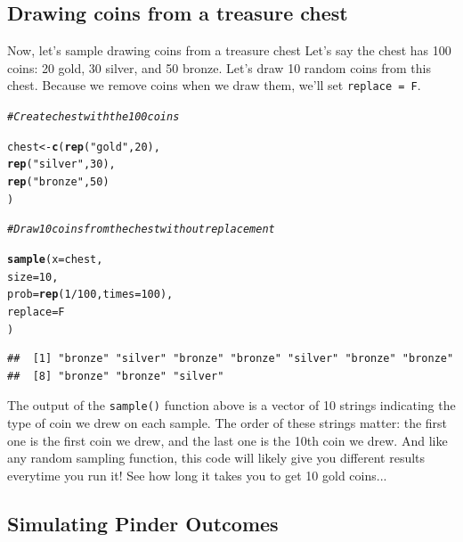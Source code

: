 \documentclass{tufte-book}\usepackage[]{graphicx}\usepackage[]{color}
\makeatletter
\newcommand{\hlnum}[1]{\textcolor[rgb]{0.686,0.059,0.569}{#1}}%
\newcommand{\hlstr}[1]{\textcolor[rgb]{0.192,0.494,0.8}{#1}}%
\newcommand{\hlcom}[1]{\textcolor[rgb]{0.678,0.584,0.686}{\textit{#1}}}%
\newcommand{\hlopt}[1]{\textcolor[rgb]{0,0,0}{#1}}%
\newcommand{\hlstd}[1]{\textcolor[rgb]{0.345,0.345,0.345}{#1}}%
\newcommand{\hlkwb}[1]{\textcolor[rgb]{0.69,0.353,0.396}{#1}}%
\newcommand{\hlkwc}[1]{\textcolor[rgb]{0.333,0.667,0.333}{#1}}%
\newcommand{\hlkwd}[1]{\textcolor[rgb]{0.737,0.353,0.396}{\textbf{#1}}}%
\newenvironment{kframe}{%
 \def\at@end@of@kframe{}%
 \ifinner\ifhmode%
  \def\at@end@of@kframe{\end{minipage}}%
  \begin{minipage}{\columnwidth}%
 \fi\fi%
 \def\FrameCommand##1{\hskip\@totalleftmargin \hskip-\fboxsep
 \colorbox{shadecolor}{##1}\hskip-\fboxsep
     \hskip-\linewidth \hskip-\@totalleftmargin \hskip\columnwidth}%
 \MakeFramed {\advance\hsize-\width
   \@totalleftmargin\z@ \linewidth\hsize
   \@setminipage}}%
 {\par\unskip\endMakeFramed%
 \at@end@of@kframe}
\newenvironment{knitrout}{}{} %
\makeatother
\begin{document}
\subsection{Drawing coins from a treasure chest}

Now, let's sample drawing coins from a treasure chest Let's say the chest has 100 coins: 20 gold, 30 silver, and 50 bronze. Let's draw 10 random coins from this chest. Because we remove coins when we draw them, we'll set \texttt{replace = F}.

\begin{knitrout}
\color{fgcolor}\begin{kframe}
\begin{alltt}
\hlcom{# Create chest with the 100 coins}

\hlstd{chest} \hlkwb{<-} \hlkwd{c}\hlstd{(}\hlkwd{rep}\hlstd{(}\hlstr{"gold"}\hlstd{,} \hlnum{20}\hlstd{),}
         \hlkwd{rep}\hlstd{(}\hlstr{"silver"}\hlstd{,} \hlnum{30}\hlstd{),}
         \hlkwd{rep}\hlstd{(}\hlstr{"bronze"}\hlstd{,} \hlnum{50}\hlstd{)}
         \hlstd{)}

\hlcom{# Draw 10 coins from the chest without replacement}

\hlkwd{sample}\hlstd{(}\hlkwc{x} \hlstd{= chest,}
       \hlkwc{size} \hlstd{=} \hlnum{10}\hlstd{,}
       \hlkwc{prob} \hlstd{=} \hlkwd{rep}\hlstd{(}\hlnum{1} \hlopt{/} \hlnum{100}\hlstd{,} \hlkwc{times} \hlstd{=} \hlnum{100}\hlstd{),}
       \hlkwc{replace} \hlstd{= F}
       \hlstd{)}
\end{alltt}
\begin{verbatim}
##  [1] "bronze" "silver" "bronze" "bronze" "silver" "bronze" "bronze"
##  [8] "bronze" "bronze" "silver"
\end{verbatim}
\end{kframe}
\end{knitrout}

The output of the \texttt{sample()} function above is a vector of 10 strings indicating the type of coin we drew on each sample. The order of these strings matter: the first one is the first coin we drew, and the last one is the 10th coin we drew. And like any random sampling function, this code will likely give you different results everytime you run it! See how long it takes you to get 10 gold coins...

\subsection{Simulating Pinder Outcomes}
\end{document}
